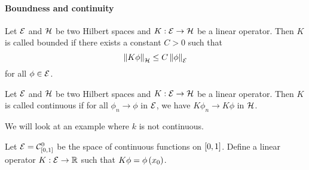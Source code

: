 \paragraph{Boundness and continuity}
\begin{definition}[boundness]
    Let $\mathcal{E}$ and $\mathcal{H}$ be two Hilbert spaces and $K:\mathcal{E}\rightarrow\mathcal{H}$ be a linear operator. Then $K$ is called bounded if there exists a constant $C>0$ such that
    \begin{equation*}
        \left\| K\phi \right\|_{\mathcal{H}}\leq C\left\| \phi \right\|_{\mathcal{E}}
    \end{equation*}
    for all $\phi\in\mathcal{E}$.
\end{definition}
\begin{definition}[continuity]
    Let $\mathcal{E}$ and $\mathcal{H}$ be two Hilbert spaces and $K:\mathcal{E}\rightarrow\mathcal{H}$ be a linear operator. Then $K$ is called continuous if for all $\phi_n\rightarrow\phi$ in $\mathcal{E}$, we have $K\phi_n\rightarrow K\phi$ in $\mathcal{H}$.
\end{definition}
We will look at an example where $k$ is not continuous.
\begin{example}
    Let $\mathcal{E}=\mathcal{C}_{\left[0,1\right]}^0$ be the space of continuous functions on $\left[0,1\right]$. Define a linear operator $K:\mathcal{E}\rightarrow\mathbb{R}$ such that $K\phi=\phi\left(x_0\right)$.
\end{example}

